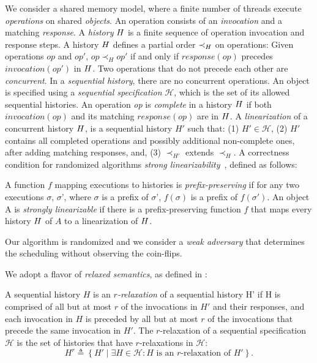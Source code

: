 
We consider a shared memory model, where a finite number of threads execute \emph{operations} on shared \emph{objects}. An operation consists of an \emph{invocation} and a matching \emph{response}. A \emph{history} \(\mathnormal{H}\) is a finite sequence of operation invocation and response steps. A history \(\mathnormal{H}\) defines a partial order \(\prec_\mathnormal{H}\) on operations: Given operations \(op\) and \(op'\), \(op \prec_H op'\) if and only if \(response(op)\) precedes \(invocation(op')\) in \(\mathnormal{H}\). Two operations that do not precede each other are \emph{concurrent}. In a \emph{sequential history}, there are no concurrent operations. An object is specified using a \emph{sequential specification} $\mathcal{H}$, which is the set of its allowed sequential histories.
An operation \emph{op} is \emph{complete} in a history \(\mathnormal{H}\) if both \(invocation(op)\) and its matching \(response(op)\) are in \(\mathnormal{H}\).
A \emph{linearization} of a concurrent history \(\mathnormal{H}\), is a sequential history $H'$ such that: (1) $H' \in \mathcal{H}$, (2) $H'$ contains all completed operations and possibly additional non-complete ones, after adding matching responses, and, (3) $\prec_{H'}$ extends $\prec_H$. A correctness condition for randomized algorithms \emph{strong linearizability}~\cite{strong_linearizability}, defined as follows: 

\begin{definition}
\label{def:strong_linearizability}
A function \(f\) mapping executions to histories is \emph{prefix-preserving} if for any two executions $\sigma$, $\sigma$', where $\sigma$ is a prefix of $\sigma$', $f(\sigma)$ is a prefix of $f(\sigma')$. 
An object A is \emph{strongly linearizable} if there is a prefix-preserving function \(f\) that maps every history \(\mathnormal{H}\) of $A$ to a linearization of \(\mathnormal{H}\).
\end{definition}

Our algorithm is randomized and we consider a \emph{weak adversary} that determines the scheduling without observing the coin-flips.

We adopt a flavor of \emph{relaxed semantics}, as defined in \cite{Henzinger_2013_Quantitative_Relaxation}:

\begin{definition}[$r$-relaxation] \label{def:r-relaxtion}
A sequential history $H$ is an \emph{$r$-relaxation} of a sequential history H' if H is comprised of all but at most $r$ of the invocations in $H'$ and their responses,
and each invocation in $H$ is preceded by all but at most $r$ of the invocations that precede the same invocation in $H'$.
The $r$-relaxation of a sequential specification $\mathcal{H}$ is the set of histories that have $r$-relaxations in $\mathcal{H}$:
\[{H}^r \triangleq \left\{ H' \mid \exists H \in \mathcal{H}: H \text{ is an } r\text{-relaxation of } H'\right\}. \]
\end{definition}
